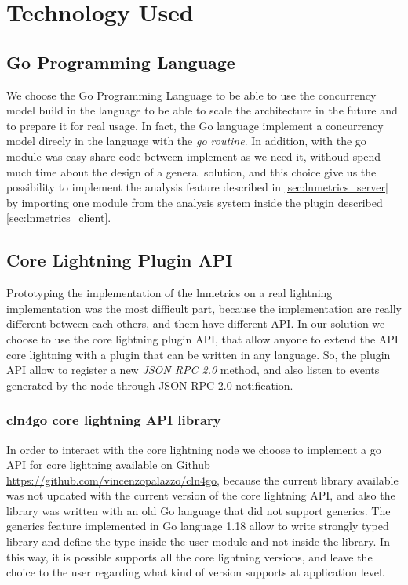 \chapter{Technology Used}

\section{Go Programming Language}

We choose the Go Programming Language to be able to use the concurrency model
build in the language to be able to scale the architecture in the future and to prepare
it for real usage. In fact, the Go language implement a concurrency model direcly in 
the language with the \emph{go routine}.
In addition, with the go module was easy share code between implement as we need it, 
withoud spend much time about the design of a general solution, and this choice
give us the possibility to implement the analysis feature described in \ref{sec:lnmetrics_server}
by importing one module from the analysis system inside the plugin described \ref{sec:lnmetrics_client}.

\section{Core Lightning Plugin API}

Prototyping the implementation of the lnmetrics on a real lightning implementation was the 
most difficult part, because the implementation are really different between each others, and 
them have different API. In our solution we choose to use the core lightning plugin API, that 
allow anyone to extend the API core lightning with a plugin that can be written in any language. 
So, the plugin API allow to register a new \emph{JSON RPC 2.0}\cite{jsonrpc20} method, and 
also listen to events generated by the node through JSON RPC 2.0 notification.

\subsection{cln4go core lightning API library}

In order to interact with the core lightning node we choose to implement a go 
API for core lightning available on Github \url{https://github.com/vincenzopalazzo/cln4go}, 
because the current library available was not updated with the current version of 
the core lightning API, and also the library was written with an old Go language 
that did not support generics. The generics feature implemented in Go language 
1.18 allow to write strongly typed library and define the type inside the 
user module and not inside the library. In this way, it is possible supports all the 
core lightning versions, and leave the choice to the user regarding what kind of version supports
at application level. 

